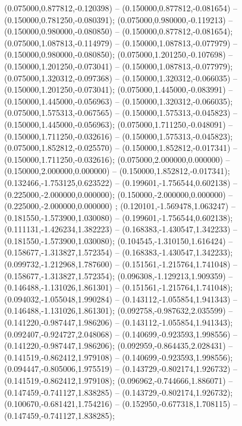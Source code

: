  (0.075000,0.877812,-0.120398) -- (0.150000,0.877812,-0.081654) -- (0.150000,0.781250,-0.080391);
 (0.075000,0.980000,-0.119213) -- (0.150000,0.980000,-0.080850) -- (0.150000,0.877812,-0.081654);
 (0.075000,1.087813,-0.114979) -- (0.150000,1.087813,-0.077979) -- (0.150000,0.980000,-0.080850);
 (0.075000,1.201250,-0.107698) -- (0.150000,1.201250,-0.073041) -- (0.150000,1.087813,-0.077979);
 (0.075000,1.320312,-0.097368) -- (0.150000,1.320312,-0.066035) -- (0.150000,1.201250,-0.073041);
 (0.075000,1.445000,-0.083991) -- (0.150000,1.445000,-0.056963) -- (0.150000,1.320312,-0.066035);
 (0.075000,1.575313,-0.067565) -- (0.150000,1.575313,-0.045823) -- (0.150000,1.445000,-0.056963);
 (0.075000,1.711250,-0.048091) -- (0.150000,1.711250,-0.032616) -- (0.150000,1.575313,-0.045823);
 (0.075000,1.852812,-0.025570) -- (0.150000,1.852812,-0.017341) -- (0.150000,1.711250,-0.032616);
 (0.075000,2.000000,0.000000) -- (0.150000,2.000000,0.000000) -- (0.150000,1.852812,-0.017341);
 (0.132466,-1.753125,0.623522) -- (0.199601,-1.756544,0.602138) -- (0.225000,-2.000000,0.000000);
 (0.150000,-2.000000,0.000000) -- (0.225000,-2.000000,0.000000) ;
 (0.120101,-1.569478,1.063247) -- (0.181550,-1.573900,1.030080) -- (0.199601,-1.756544,0.602138);
 (0.111131,-1.426234,1.382223) -- (0.168383,-1.430547,1.342233) -- (0.181550,-1.573900,1.030080);
 (0.104545,-1.310150,1.616424) -- (0.158677,-1.313827,1.572354) -- (0.168383,-1.430547,1.342233);
 (0.099732,-1.212968,1.787600) -- (0.151561,-1.215764,1.741048) -- (0.158677,-1.313827,1.572354);
 (0.096308,-1.129213,1.909359) -- (0.146488,-1.131026,1.861301) -- (0.151561,-1.215764,1.741048);
 (0.094032,-1.055048,1.990284) -- (0.143112,-1.055854,1.941343) -- (0.146488,-1.131026,1.861301);
 (0.092758,-0.987632,2.035599) -- (0.141220,-0.987447,1.986206) -- (0.143112,-1.055854,1.941343);
 (0.092407,-0.924727,2.048068) -- (0.140699,-0.923593,1.998556) -- (0.141220,-0.987447,1.986206);
 (0.092959,-0.864435,2.028431) -- (0.141519,-0.862412,1.979108) -- (0.140699,-0.923593,1.998556);
 (0.094447,-0.805006,1.975519) -- (0.143729,-0.802174,1.926732) -- (0.141519,-0.862412,1.979108);
 (0.096962,-0.744666,1.886071) -- (0.147459,-0.741127,1.838285) -- (0.143729,-0.802174,1.926732);
 (0.100670,-0.681421,1.754216) -- (0.152950,-0.677318,1.708115) -- (0.147459,-0.741127,1.838285);
